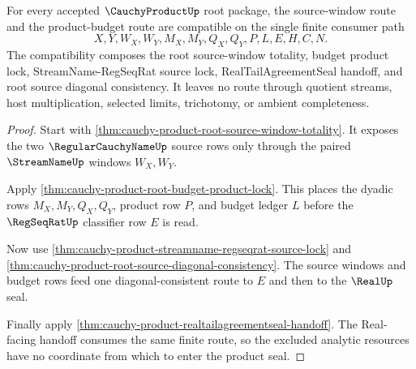 \begin{theorem}
\label{thm:cauchy-product-source-window-budget-compatibility}
For every accepted $\CauchyProductUp$ root package, the source-window route and the product-budget route are compatible on the single finite consumer path
$$
X,Y,W_X,W_Y,M_X,M_Y,Q_X,Q_Y,P,L,E,H,C,N.
$$
The compatibility composes the root source-window totality, budget product lock, StreamName-RegSeqRat source lock, RealTailAgreementSeal handoff, and root source diagonal consistency. It leaves no route through quotient streams, host multiplication, selected limits, trichotomy, or ambient completeness.
\end{theorem}
\begin{proof}
Start with \autoref{thm:cauchy-product-root-source-window-totality}. It exposes the two $\RegularCauchyNameUp$ source rows only through the paired $\StreamNameUp$ windows $W_X,W_Y$.

Apply \autoref{thm:cauchy-product-root-budget-product-lock}. This places the dyadic rows $M_X,M_Y,Q_X,Q_Y$, product row $P$, and budget ledger $L$ before the $\RegSeqRatUp$ classifier row $E$ is read.

Now use \autoref{thm:cauchy-product-streamname-regseqrat-source-lock} and \autoref{thm:cauchy-product-root-source-diagonal-consistency}. The source windows and budget rows feed one diagonal-consistent route to $E$ and then to the $\RealUp$ seal.

Finally apply \autoref{thm:cauchy-product-realtailagreementseal-handoff}. The Real-facing handoff consumes the same finite route, so the excluded analytic resources have no coordinate from which to enter the product seal.
\end{proof}


